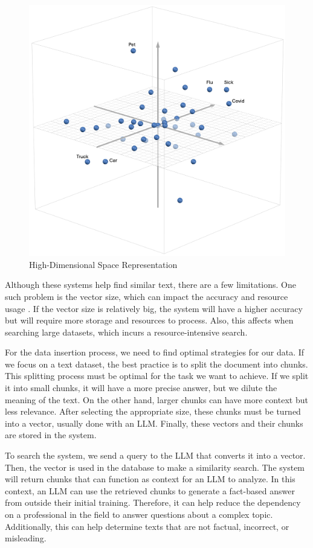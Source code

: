   \begin{figure}[!h]
    \centering
        \includegraphics[width=0.85\linewidth]{images/Vector_example_update.png}
        \caption{High-Dimensional Space Representation}
        \label{vector_space}
\end{figure}

Although these systems help find similar text, there are a few limitations. One such problem is the vector size, which can impact the accuracy and resource usage \cite{han2023comprehensivesurveyvectordatabase}. If
the vector size is relatively big, the system will have a higher accuracy but will require more storage and resources to process. Also, this affects when searching large datasets, which incurs a resource-intensive search.
 
For the data insertion process, we need to find optimal strategies for our data. If we focus on a text dataset, the best practice is to split the document into chunks. This splitting process must be optimal for the task we want
to achieve. If we split it into small chunks, it will have a more precise answer, but we dilute the meaning of the text. On the other hand, larger chunks can have more context but less relevance. After selecting the appropriate
size, these chunks must be turned into a vector, usually done with an LLM. Finally, these vectors and their chunks are stored in the system. 

To search the system, we send a query to the LLM that converts it into a vector. Then, the vector is used in the database to make a similarity search. The system will return chunks that can function as context for an LLM to
analyze. In this context, an LLM can use the retrieved chunks to generate a fact-based answer from outside their initial training. Therefore, it can help reduce the dependency on a professional in the field to answer questions
about a complex topic. Additionally, this can help determine texts that are not factual, incorrect, or misleading.



